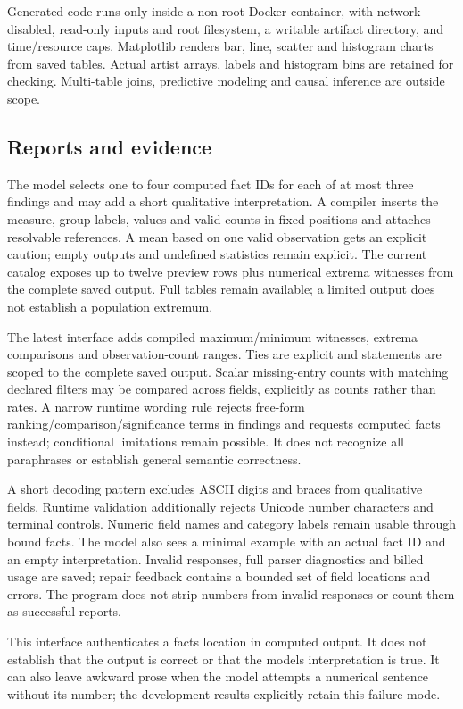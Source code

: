 Generated code runs only inside a non-root Docker container, with network disabled, read-only inputs and root filesystem, a writable artifact directory, and time/resource caps. Matplotlib renders bar, line, scatter and histogram charts from saved tables. Actual artist arrays, labels and histogram bins are retained for checking. Multi-table joins, predictive modeling and causal inference are outside scope.

\subsection{Reports and evidence}\label{reports-and-evidence}

The model selects one to four computed fact IDs for each of at most three findings and may add a short qualitative interpretation. A compiler inserts the measure, group labels, values and valid counts in fixed positions and attaches resolvable references. A mean based on one valid observation gets an explicit caution; empty outputs and undefined statistics remain explicit. The current catalog exposes up to twelve preview rows plus numerical extrema witnesses from the complete saved output. Full tables remain available; a limited output does not establish a population extremum.

The latest interface adds compiled maximum/minimum witnesses, extrema comparisons and observation-count ranges. Ties are explicit and statements are scoped to the complete saved output. Scalar missing-entry counts with matching declared filters may be compared across fields, explicitly as counts rather than rates. A narrow runtime wording rule rejects free-form ranking/comparison/significance terms in findings and requests computed facts instead; conditional limitations remain possible. It does not recognize all paraphrases or establish general semantic correctness.

A short decoding pattern excludes ASCII digits and braces from qualitative fields. Runtime validation additionally rejects Unicode number characters and terminal controls. Numeric field names and category labels remain usable through bound facts. The model also sees a minimal example with an actual fact ID and an empty interpretation. Invalid responses, full parser diagnostics and billed usage are saved; repair feedback contains a bounded set of field locations and errors. The program does not strip numbers from invalid responses or count them as successful reports.

This interface authenticates a fact\textquotesingle s location in computed output. It does not establish that the output is correct or that the model\textquotesingle s interpretation is true. It can also leave awkward prose when the model attempts a numerical sentence without its number; the development results explicitly retain this failure mode.

